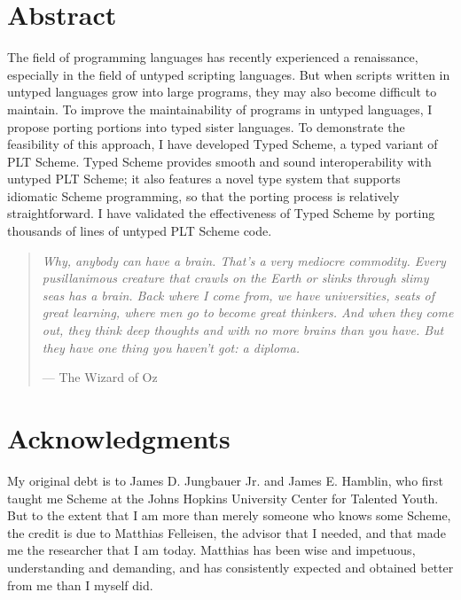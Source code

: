 

\chapter{Abstract}

\thispagestyle{empty}

The field of programming languages has recently experienced a renaissance,
especially in the field of untyped scripting languages.  But when
scripts written in untyped languages grow into large programs, they may
also become difficult to maintain. To improve the maintainability of
programs in untyped languages, I propose porting portions into
typed sister languages.  To demonstrate the feasibility of this approach, I have
developed Typed Scheme, a typed variant of PLT Scheme.  Typed
Scheme provides smooth and sound interoperability with untyped PLT
Scheme;  it also features a novel type system that supports idiomatic
Scheme programming, so that the porting process is relatively
straightforward.  I have validated the effectiveness of Typed Scheme
by porting thousands of lines of untyped PLT Scheme code.

\cleardoublepage

\vspace*{\fill}
\vspace{-1.5in}
\begin{center}
  \begin{quote}
    \textit{Why, anybody can have a brain. That's a very mediocre
    commodity. Every pusillanimous creature that crawls on the Earth
    or slinks through slimy seas has a brain. Back where I come
    from, we have universities, seats of great learning, where men
    go to become great thinkers. And when they come out, they think
    deep thoughts and with no more brains than you have. But they
    have one thing you haven't got: a diploma.}
    
    \hspace*{\fill} --- \textrm{The Wizard of Oz}
  \end{quote}
\end{center}
\vspace*{\fill}


\chapter[Acknowledgments]{Acknowledgments\vspace{-24pt}}


My original debt is to James D. Jungbauer Jr. and James
E. Hamblin, who first taught me Scheme at the
Johns Hopkins University Center for Talented Youth.  But to the extent that I am
more than merely someone who knows some Scheme, the credit is due to
Matthias Felleisen, the advisor that I needed, and that made me the
researcher that I am today.  Matthias has been wise and impetuous,
understanding and demanding, and has consistently expected and
obtained better from me than I myself did.  

